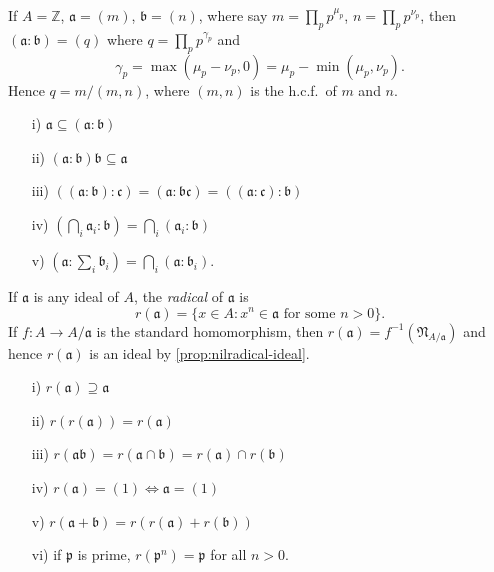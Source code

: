 \begin{example}
    If $A = \mathbb{Z}$, $\mathfrak{a} = (m)$, $\mathfrak{b} = (n)$, where say $m = \prod_p p^{\mu_p}$, $n = \prod_p p^{\nu_p}$, then $(\mathfrak{a} : \mathfrak{b}) = (q)$ where $q = \prod_p p^{\gamma_p}$ and
    \[
    \gamma_p = \max(\mu_p - \nu_p, 0) = \mu_p - \min(\mu_p, \nu_p).
    \]
    Hence $q = m/(m, n)$, where $(m, n)$ is the h.c.f.\ of $m$ and $n$.
\end{example}

\begin{exercise}
    \begin{enumerate}
    \item[i)] $\mathfrak{a} \subseteq (\mathfrak{a} : \mathfrak{b})$
    \item[ii)] $(\mathfrak{a} : \mathfrak{b})\mathfrak{b} \subseteq \mathfrak{a}$
    \item[iii)] $((\mathfrak{a} : \mathfrak{b}) : \mathfrak{c}) = (\mathfrak{a} : \mathfrak{b}\mathfrak{c}) = ((\mathfrak{a} : \mathfrak{c}) : \mathfrak{b})$
    \item[iv)] $\left(\bigcap_i \mathfrak{a}_i : \mathfrak{b}\right) = \bigcap_i (\mathfrak{a}_i : \mathfrak{b})$
    \item[v)] $(\mathfrak{a} : \sum_i \mathfrak{b}_i) = \bigcap_i (\mathfrak{a} : \mathfrak{b}_i)$.
\end{enumerate}
\end{exercise}

If $\mathfrak{a}$ is any ideal of $A$, the \emph{radical} of $\mathfrak{a}$ is
\[
r(\mathfrak{a}) = \{x \in A : x^n \in \mathfrak{a} \text{ for some } n > 0\}.
\]
If $f \colon A \to A/\mathfrak{a}$ is the standard homomorphism, then $r(\mathfrak{a}) = f^{-1}(\mathfrak{N}_{A/\mathfrak{a}})$ and hence $r(\mathfrak{a})$ is an ideal by \eqref{prop:nilradical-ideal}.

\begin{exercise}\label{exer:radical-properties}
    \begin{enumerate}
    \item[i)] $r(\mathfrak{a}) \supseteq \mathfrak{a}$
    \item[ii)] $r(r(\mathfrak{a})) = r(\mathfrak{a})$
    \item[iii)] $r(\mathfrak{a}\mathfrak{b}) = r(\mathfrak{a} \cap \mathfrak{b}) = r(\mathfrak{a}) \cap r(\mathfrak{b})$
    \item[iv)] $r(\mathfrak{a}) = (1) \iff \mathfrak{a} = (1)$
    \item[v)] $r(\mathfrak{a} + \mathfrak{b}) = r(r(\mathfrak{a}) + r(\mathfrak{b}))$
    \item[vi)] if $\mathfrak{p}$ is prime, $r(\mathfrak{p}^n) = \mathfrak{p}$ for all $n > 0$.
\end{enumerate}
\end{exercise}

